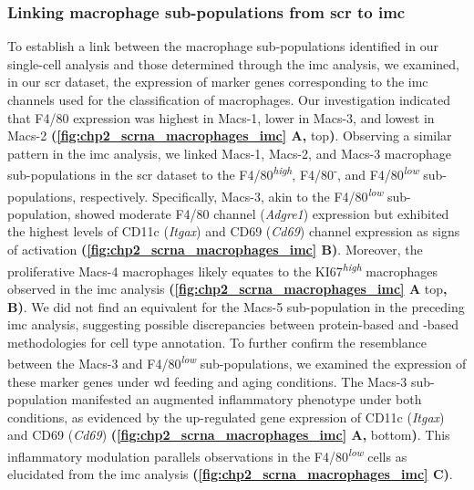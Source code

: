 





\subsubsection{\large Linking macrophage sub-populations from \gls{scr} to \gls{imc}}

To establish a link between the macrophage sub-populations identified in our single-cell analysis and those determined through the \gls{imc} analysis, we examined, in our \gls{scr} dataset, the expression of marker genes corresponding to the \gls{imc} channels used for the classification of macrophages. Our investigation indicated that F4/80 expression was highest in Macs-1, lower in Macs-3, and lowest in Macs-2 \textbf{(\autoref{fig:chp2_scrna_macrophages_imc} A,} top\textbf{)}. Observing a similar pattern in the \gls{imc} analysis, we linked Macs-1, Macs-2, and Macs-3 macrophage sub-populations in the \gls{scr} dataset to the F4/80\textsuperscript{\textit{high}}, F4/80\textsuperscript{-}, and F4/80\textsuperscript{\textit{low}} sub-populations, respectively. Specifically, Macs-3, akin to the F4/80\textsuperscript{\textit{low}} sub-population, showed moderate F4/80 channel (\textit{Adgre1}) expression but exhibited the highest levels of CD11c (\textit{Itgax}) and CD69 (\textit{Cd69}) channel expression as signs of activation \textbf{(\autoref{fig:chp2_scrna_macrophages_imc} B)}. Moreover, the proliferative Macs-4 macrophages likely equates to the KI67\textsuperscript{\textit{high}} macrophages observed in the \gls{imc} analysis \textbf{(\autoref{fig:chp2_scrna_macrophages_imc} A} top\textbf{, B)}. We did not find an equivalent for the Macs-5 sub-population in the preceding \gls{imc} analysis, suggesting possible discrepancies between protein-based and -based methodologies for cell type annotation. To further confirm the resemblance between the Macs-3 and F4/80\textsuperscript{\textit{low}} sub-populations, we examined the expression of these marker genes under \gls{wd} feeding and aging conditions. The Macs-3 sub-population manifested an augmented inflammatory phenotype under both conditions, as evidenced by the up-regulated gene expression of CD11c (\textit{Itgax}) and CD69 (\textit{Cd69}) \textbf{(\autoref{fig:chp2_scrna_macrophages_imc} A,} bottom\textbf{)}. This inflammatory modulation parallels observations in the F4/80\textsuperscript{\textit{low}} cells as elucidated from the \gls{imc} analysis \textbf{(\autoref{fig:chp2_scrna_macrophages_imc} C)}.\\


